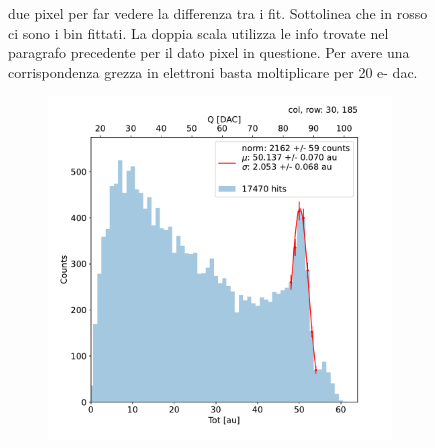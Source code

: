 \begin{figure}[h!]
\begin{subfigure}{.5\textwidth}
            \label{fig:}
            \end{subfigure}
            \caption{due pixel per far vedere la differenza tra i fit. Sottolinea che in rosso ci sono i bin fittati. La doppia scala utilizza le info trovate nel paragrafo precedente per il dato pixel in questione. Per avere una corrispondenza grezza in elettroni basta moltiplicare per 20 e- dac. }
        \end{figure}            

        \begin{figure}[h!]
            \begin{subfigure}{.5\textwidth}
            \centering
            \includegraphics[width=.99\linewidth]{figures/charaterization/fit_gauss_r185.pdf}
            \label{fig:}
            \end{subfigure}
            \begin{subfigure}{.5\textwidth}
            \centering

\end{subfigure}
\end{figure}
